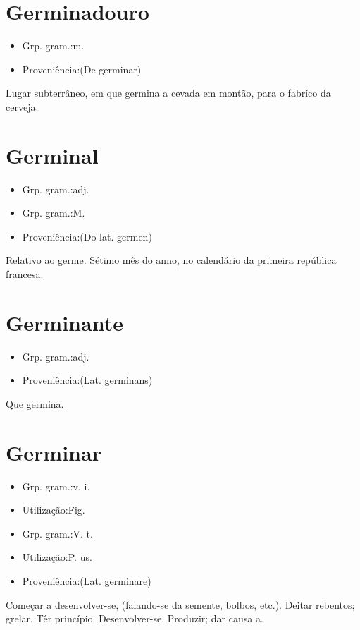 \section{Germinadouro}
\begin{itemize}
\item {Grp. gram.:m.}
\end{itemize}
\begin{itemize}
\item {Proveniência:(De \textunderscore germinar\textunderscore )}
\end{itemize}
Lugar subterrâneo, em que germina a cevada em montão, para o fabríco da cerveja.
\section{Germinal}
\begin{itemize}
\item {Grp. gram.:adj.}
\end{itemize}
\begin{itemize}
\item {Grp. gram.:M.}
\end{itemize}
\begin{itemize}
\item {Proveniência:(Do lat. \textunderscore germen\textunderscore )}
\end{itemize}
Relativo ao germe.
Sétimo mês do anno, no calendário da primeira república francesa.
\section{Germinante}
\begin{itemize}
\item {Grp. gram.:adj.}
\end{itemize}
\begin{itemize}
\item {Proveniência:(Lat. \textunderscore germinans\textunderscore )}
\end{itemize}
Que germina.
\section{Germinar}
\begin{itemize}
\item {Grp. gram.:v. i.}
\end{itemize}
\begin{itemize}
\item {Utilização:Fig.}
\end{itemize}
\begin{itemize}
\item {Grp. gram.:V. t.}
\end{itemize}
\begin{itemize}
\item {Utilização:P. us.}
\end{itemize}
\begin{itemize}
\item {Proveniência:(Lat. \textunderscore germinare\textunderscore )}
\end{itemize}
Começar a desenvolver-se, (falando-se da semente, bolbos, etc.).
Deitar rebentos; grelar.
Têr princípio.
Desenvolver-se.
Produzir; dar causa a.
